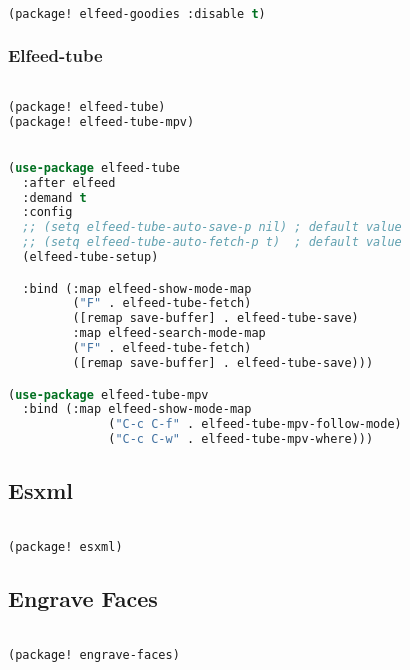 \documentclass[11pt]{article}
\begin{document}
\begin{lstlisting}[language=Lisp]%! Someone please complete this list for me

(package! elfeed-goodies :disable t)
\end{lstlisting}

\subsubsection{Elfeed-tube}
\label{sec:elfeed-tube}
\begin{lstlisting}[language=Lisp]%! Someone please complete this list for me

(package! elfeed-tube)
(package! elfeed-tube-mpv)
\end{lstlisting}

\begin{lstlisting}[language=Lisp]%! Someone please complete this list for me

(use-package elfeed-tube
  :after elfeed
  :demand t
  :config
  ;; (setq elfeed-tube-auto-save-p nil) ; default value
  ;; (setq elfeed-tube-auto-fetch-p t)  ; default value
  (elfeed-tube-setup)

  :bind (:map elfeed-show-mode-map
         ("F" . elfeed-tube-fetch)
         ([remap save-buffer] . elfeed-tube-save)
         :map elfeed-search-mode-map
         ("F" . elfeed-tube-fetch)
         ([remap save-buffer] . elfeed-tube-save)))

(use-package elfeed-tube-mpv
  :bind (:map elfeed-show-mode-map
              ("C-c C-f" . elfeed-tube-mpv-follow-mode)
              ("C-c C-w" . elfeed-tube-mpv-where)))
\end{lstlisting}


\subsection{Esxml}
\label{sec:esxml}
\begin{lstlisting}[language=Lisp]%! Someone please complete this list for me

(package! esxml)
\end{lstlisting}

\subsection{Engrave Faces}
\label{sec:engrave-faces}
\begin{lstlisting}[language=Lisp]%! Someone please complete this list for me

(package! engrave-faces)
\end{lstlisting}
\end{document}
